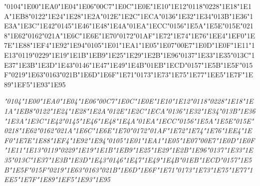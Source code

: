 {\LibertinusSerifPatch
	\char"0104\gs \char"1E00\gs \char"1EA0\gs \char"1E04\gs \char"1E06\gs \char"00C7\gs \char"1E0C\gs \char"1E0E\gs \char"1E10\gs \char"1E12\gs \char"0118\gs \char"0228\gs \char"1E18\gs \char"1E1A\gs \char"1EB8\gs \char"0122\gs \char"1E24\gs \char"1E28\gs \char"1E2A\gs \char"012E\gs \char"1E2C\gs \char"1ECA\gs \char"0136\gs \char"1E32\gs \char"1E34\gs \char"013B\gs \char"1E36\gs \char"1E3A\gs \char"1E3C\gs \char"1E42\gs \char"0145\gs \char"1E46\gs \char"1E48\gs \char"1E4A\gs \char"01EA\gs \char"1ECC\gs \char"0156\gs \char"1E5A\gs \char"1E5E\gs \char"015E\gs \char"0218\gs \char"1E62\gs \char"0162\gs \char"021A\gs \char"1E6C\gs \char"1E6E\gs \char"1E70\gs \char"0172\gs \char"01AF\gs \char"1E72\gs \char"1E74\gs \char"1E76\gs \char"1EE4\gs \char"1EF0\gs \char"1E7E\gs \char"1E88\gs \char"1EF4\gs \char"1E92\gs \char"1E94\gs \char"0105\gs \char"1E01\gs \char"1EA1\gs \char"1E05\gs \char"1E07\gs \char"00E7\gs \char"1E0D\gs \char"1E0F\gs \char"1E11\gs \char"1E13\gs \char"0119\gs \char"0229\gs \char"1E19\gs \char"1E1B\gs \char"1EB9\gs \char"1E25\gs \char"1E29\gs \char"1E2B\gs \char"1E96\gs \char"0137\gs \char"1E33\gs \char"1E35\gs \char"013C\gs \char"1E37\gs \char"1E3B\gs \char"1E3D\gs \char"1E43\gs \char"0146\gs \char"1E47\gs \char"1E49\gs \char"1E4B\gs \char"01EB\gs \char"1ECD\gs \char"0157\gs \char"1E5B\gs \char"1E5F\gs \char"015F\gs \char"0219\gs \char"1E63\gs \char"0163\gs \char"021B\gs \char"1E6D\gs \char"1E6F\gs \char"1E71\gs \char"0173\gs \char"1E73\gs \char"1E75\gs \char"1E77\gs \char"1EE5\gs \char"1E7F\gs \char"1E89\gs \char"1EF5\gs \char"1E93\gs \char"1E95\gs
}

{\LibertinusSerifPatch\itshape 
	\char"0104\gs \char"1E00\gs \char"1EA0\gs \char"1E04\gs \char"1E06\gs \char"00C7\gs \char"1E0C\gs \char"1E0E\gs \char"1E10\gs \char"1E12\gs \char"0118\gs \char"0228\gs \char"1E18\gs \char"1E1A\gs \char"1EB8\gs \char"0122\gs \char"1E24\gs \char"1E28\gs \char"1E2A\gs \char"012E\gs \char"1E2C\gs \char"1ECA\gs \char"0136\gs \char"1E32\gs \char"1E34\gs \char"013B\gs \char"1E36\gs \char"1E3A\gs \char"1E3C\gs \char"1E42\gs \char"0145\gs \char"1E46\gs \char"1E48\gs \char"1E4A\gs \char"01EA\gs \char"1ECC\gs \char"0156\gs \char"1E5A\gs \char"1E5E\gs \char"015E\gs \char"0218\gs \char"1E62\gs \char"0162\gs \char"021A\gs \char"1E6C\gs \char"1E6E\gs \char"1E70\gs \char"0172\gs \char"01AF\gs \char"1E72\gs \char"1E74\gs \char"1E76\gs \char"1EE4\gs \char"1EF0\gs \char"1E7E\gs \char"1E88\gs \char"1EF4\gs \char"1E92\gs \char"1E94\gs \char"0105\gs \char"1E01\gs \char"1EA1\gs \char"1E05\gs \char"1E07\gs \char"00E7\gs \char"1E0D\gs \char"1E0F\gs \char"1E11\gs \char"1E13\gs \char"0119\gs \char"0229\gs \char"1E19\gs \char"1E1B\gs \char"1EB9\gs \char"1E25\gs \char"1E29\gs \char"1E2B\gs \char"1E96\gs \char"0137\gs \char"1E33\gs \char"1E35\gs \char"013C\gs \char"1E37\gs \char"1E3B\gs \char"1E3D\gs \char"1E43\gs \char"0146\gs \char"1E47\gs \char"1E49\gs \char"1E4B\gs \char"01EB\gs \char"1ECD\gs \char"0157\gs \char"1E5B\gs \char"1E5F\gs \char"015F\gs \char"0219\gs \char"1E63\gs \char"0163\gs \char"021B\gs \char"1E6D\gs \char"1E6F\gs \char"1E71\gs \char"0173\gs \char"1E73\gs \char"1E75\gs \char"1E77\gs \char"1EE5\gs \char"1E7F\gs \char"1E89\gs \char"1EF5\gs \char"1E93\gs \char"1E95\gs
}

